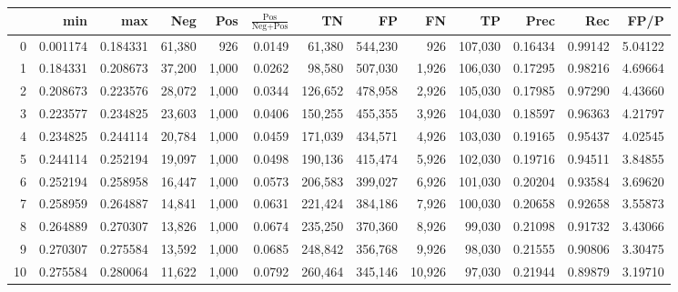 \begin{tabular}{rrrrrrrrrrrrr}
\toprule
{} &       min &       max &     Neg &    Pos & $\frac{\text{Pos}}{\text{Neg}+\text{Pos}}$ &       TN &       FP &       FN &       TP &     Prec &      Rec &     FP/P \\
\midrule
0   &  0.001174 &  0.184331 &  61,380 &    926 &                                     0.0149 &   61,380 &  544,230 &      926 &  107,030 &  0.16434 &  0.99142 &  5.04122 \\
1   &  0.184331 &  0.208673 &  37,200 &  1,000 &                                     0.0262 &   98,580 &  507,030 &    1,926 &  106,030 &  0.17295 &  0.98216 &  4.69664 \\
2   &  0.208673 &  0.223576 &  28,072 &  1,000 &                                     0.0344 &  126,652 &  478,958 &    2,926 &  105,030 &  0.17985 &  0.97290 &  4.43660 \\
3   &  0.223577 &  0.234825 &  23,603 &  1,000 &                                     0.0406 &  150,255 &  455,355 &    3,926 &  104,030 &  0.18597 &  0.96363 &  4.21797 \\
4   &  0.234825 &  0.244114 &  20,784 &  1,000 &                                     0.0459 &  171,039 &  434,571 &    4,926 &  103,030 &  0.19165 &  0.95437 &  4.02545 \\
5   &  0.244114 &  0.252194 &  19,097 &  1,000 &                                     0.0498 &  190,136 &  415,474 &    5,926 &  102,030 &  0.19716 &  0.94511 &  3.84855 \\
6   &  0.252194 &  0.258958 &  16,447 &  1,000 &                                     0.0573 &  206,583 &  399,027 &    6,926 &  101,030 &  0.20204 &  0.93584 &  3.69620 \\
7   &  0.258959 &  0.264887 &  14,841 &  1,000 &                                     0.0631 &  221,424 &  384,186 &    7,926 &  100,030 &  0.20658 &  0.92658 &  3.55873 \\
8   &  0.264889 &  0.270307 &  13,826 &  1,000 &                                     0.0674 &  235,250 &  370,360 &    8,926 &   99,030 &  0.21098 &  0.91732 &  3.43066 \\
9   &  0.270307 &  0.275584 &  13,592 &  1,000 &                                     0.0685 &  248,842 &  356,768 &    9,926 &   98,030 &  0.21555 &  0.90806 &  3.30475 \\
10  &  0.275584 &  0.280064 &  11,622 &  1,000 &                                     0.0792 &  260,464 &  345,146 &   10,926 &   97,030 &  0.21944 &  0.89879 &  3.19710 \\

\end{tabular}
